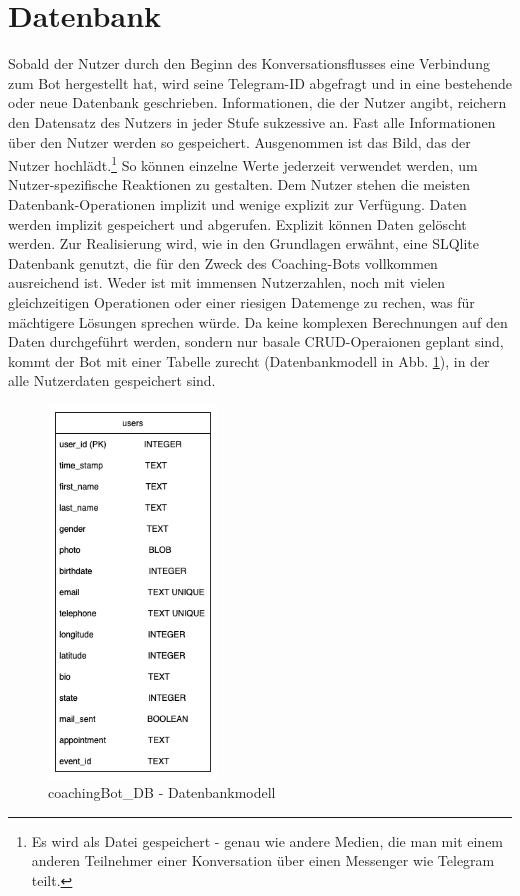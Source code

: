     
    \section{Datenbank} \label{Realisierung: Datenbank}
        Sobald der Nutzer durch den Beginn des Konversationsflusses eine Verbindung zum Bot hergestellt hat, wird seine Telegram-ID abgefragt und in eine bestehende oder neue Datenbank geschrieben. Informationen, die der Nutzer angibt, reichern den Datensatz des Nutzers in jeder Stufe sukzessive an. Fast alle Informationen über den Nutzer werden so gespeichert. Ausgenommen ist das Bild, das der Nutzer hochlädt.\footnote{Es wird als Datei gespeichert - genau wie andere Medien, die man mit einem anderen Teilnehmer einer Konversation über einen Messenger wie Telegram teilt.} So können einzelne Werte jederzeit verwendet werden, um Nutzer-spezifische Reaktionen zu gestalten. Dem Nutzer stehen die meisten Datenbank-Operationen implizit und wenige explizit zur Verfügung. Daten werden implizit gespeichert und abgerufen. Explizit können Daten gelöscht werden. Zur Realisierung wird, wie in den Grundlagen erwähnt, eine SLQlite Datenbank genutzt, die für den Zweck des Coaching-Bots vollkommen ausreichend ist. Weder ist mit immensen Nutzerzahlen, noch mit vielen gleichzeitigen Operationen oder einer riesigen Datemenge zu rechen, was für mächtigere Lösungen sprechen würde. Da keine komplexen Berechnungen auf den Daten durchgeführt werden, sondern nur basale CRUD-Operaionen geplant sind, kommt der Bot mit einer Tabelle zurecht (Datenbankmodell in Abb. \ref{fig: data base model}), in der alle Nutzerdaten gespeichert sind.
        \begin{figure} %
            \centering
            \includegraphics[width=0.4\textwidth]{images/220325_PA28464_DataBaseModel.png}
            \caption{coachingBot\_DB - Datenbankmodell}
            \label{fig: data base model}
        \end{figure}


